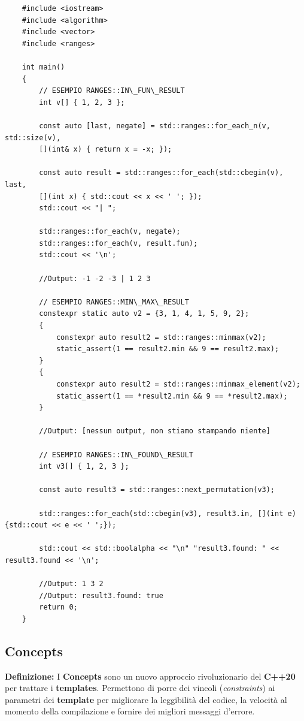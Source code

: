\begin{lstlisting}
	#include <iostream>
	#include <algorithm>
	#include <vector>
	#include <ranges>
	
	int main()
	{
		// ESEMPIO RANGES::IN\_FUN\_RESULT
		int v[] { 1, 2, 3 };
		
		const auto [last, negate] = std::ranges::for_each_n(v, std::size(v),
		[](int& x) { return x = -x; });
		
		const auto result = std::ranges::for_each(std::cbegin(v), last,
		[](int x) { std::cout << x << ' '; });
		std::cout << "| ";
		
		std::ranges::for_each(v, negate);
		std::ranges::for_each(v, result.fun);
		std::cout << '\n';
		
		//Output: -1 -2 -3 | 1 2 3
		
		// ESEMPIO RANGES::MIN\_MAX\_RESULT
		constexpr static auto v2 = {3, 1, 4, 1, 5, 9, 2};
		{
			constexpr auto result2 = std::ranges::minmax(v2);
			static_assert(1 == result2.min && 9 == result2.max);
		}
		{
			constexpr auto result2 = std::ranges::minmax_element(v2);
			static_assert(1 == *result2.min && 9 == *result2.max);
		}
		
		//Output: [nessun output, non stiamo stampando niente]
		
		// ESEMPIO RANGES::IN\_FOUND\_RESULT
		int v3[] { 1, 2, 3 };
		
		const auto result3 = std::ranges::next_permutation(v3);
		
		std::ranges::for_each(std::cbegin(v3), result3.in, [](int e){std::cout << e << ' ';});
		
		std::cout << std::boolalpha << "\n" "result3.found: " << result3.found << '\n';
		
		//Output: 1 3 2 
		//Output: result3.found: true
		return 0;
	}
\end{lstlisting}

\newpage

\subsection{Concepts}

\label{concepts}

\textsf{\small \textbf{Definizione: } I \textbf{Concepts} sono un nuovo approccio rivoluzionario del \textbf{C++20} per trattare i \textbf{templates}. Permettono di porre dei vincoli (\emph{constraints}) ai parametri dei \textbf{template} per migliorare la leggibilità del codice, la velocità al momento della compilazione e fornire dei migliori messaggi d'errore.} \\

